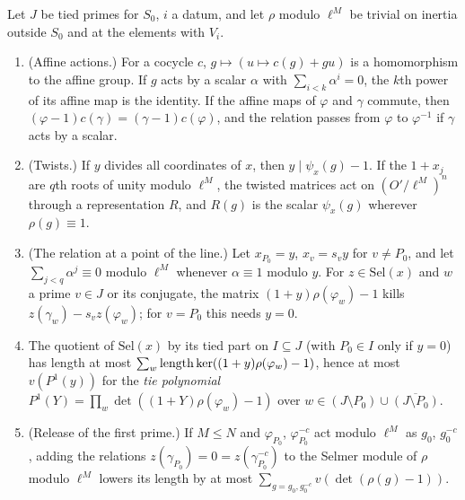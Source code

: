 \begin{lemma}\label{lem:untied}
Let $J$ be tied primes for $S_0$, $i$ a datum, and let $\rho$ modulo $\ell^M$ be trivial on inertia outside $S_0$ and at the elements with $V_i$.
\begin{enumerate}[label=\textup{(\alph*)}]
\item (Affine actions.) For a cocycle $c$, $g\mapsto(u\mapsto c(g)+gu)$ is a homomorphism to the affine group. If $g$ acts by a scalar $\alpha$ with $\sum_{i<k}\alpha^i=0$, the $k$th power of its affine map is the identity. If the affine maps of $\varphi$ and $\gamma$ commute, then $(\varphi-1)c(\gamma)=(\gamma-1)c(\varphi)$, and the relation passes
from $\varphi$ to $\varphi^{-1}$ if $\gamma$ acts by a scalar.
\item (Twists.) If $y$ divides all coordinates of $x$, then $y\mid\psi_x(g)-1$. If the $1+x_j$ are $q$th roots of unity modulo $\ell^M$, the twisted matrices act on $(O'/\ell^M)^n$ through a representation $R$, and $R(g)$ is the scalar $\psi_x(g)$ wherever $\rho(g)\equiv1$.
\item (The relation at a point of the line.) Let $x_{P_0}=y$, $x_v=s_vy$ for $v\ne P_0$, and let $\sum_{j<q}\alpha^j\equiv0$ modulo $\ell^M$ whenever $\alpha\equiv1$ modulo $y$. For $z\in\mathrm{Sel}(x)$ and $w$ a prime $v\in J$ or its conjugate, the matrix $(1+y)\rho(\varphi_w)-1$ kills $z(\gamma_w)-s_vz(\varphi_w)$; for $v=P_0$ this needs
$y=0$.
\item The quotient of $\mathrm{Sel}(x)$ by its tied part on $I\subseteq J$ (with $P_0\in I$ only if $y=0$) has length at most $\sum_w\operatorname{length}\ker((1+y)\rho(\varphi_w)-1)$, hence at most $v(P^1(y))$ for the \emph{tie polynomial} $P^1(Y)=\prod_w\det((1+Y)\rho(\varphi_w)-1)$ over $w\in(J\setminus P_0)\cup\overline{(J\setminus P_0)}$.
\item (Release of the first prime.) If $M\le N$ and $\varphi_{P_0}$, $\varphi_{P_0}^{-c}$ act modulo $\ell^M$ as $g_0$, $g_0^{-c}$, adding the relations $z(\gamma_{P_0})=0=z(\gamma_{P_0}^{-c})$ to the Selmer module of $\rho$ modulo $\ell^M$ lowers its length by at most $\sum_{g=g_0,g_0^{-c}}v(\det(\rho(g)-1))$.
\end{enumerate}
\end{lemma}

